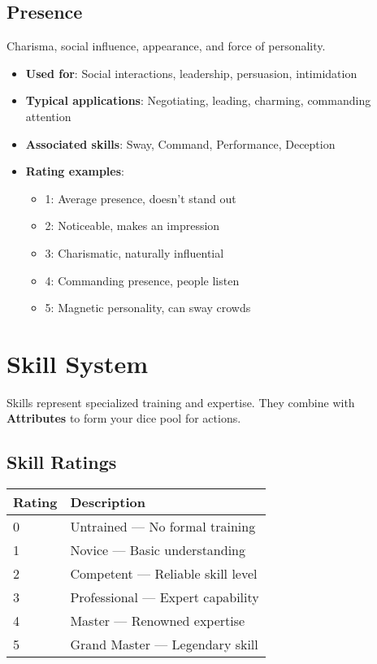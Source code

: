 \subsection*{Presence}

Charisma, social influence, appearance, and force of personality.
\begin{itemize}
\item \textbf{Used for}: Social interactions, leadership, persuasion, intimidation
\item \textbf{Typical applications}: Negotiating, leading, charming, commanding attention
\item \textbf{Associated skills}: Sway, Command, Performance, Deception
\item \textbf{Rating examples}:
  \begin{itemize}
    \item 1: Average presence, doesn't stand out
    \item 2: Noticeable, makes an impression
    \item 3: Charismatic, naturally influential
    \item 4: Commanding presence, people listen
    \item 5: Magnetic personality, can sway crowds
  \end{itemize}
\end{itemize}

\section{Skill System}

Skills represent specialized training and expertise. They combine with \textbf{Attributes} to form your dice pool for actions.

\subsection*{Skill Ratings}
\begin{center}
\small
\begin{tabular}{ll}
\toprule
\textbf{Rating} & \textbf{Description} \\
\midrule
0 & Untrained --- No formal training \\
1 & Novice --- Basic understanding \\
2 & Competent --- Reliable skill level \\
3 & Professional --- Expert capability \\
4 & Master --- Renowned expertise \\
5 & Grand Master --- Legendary skill \\
\bottomrule
\end{tabular}
\end{center}

